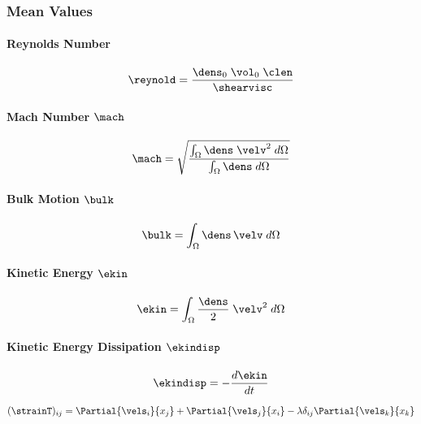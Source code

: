 \subsubsection{Mean Values}

\paragraph{Reynolds Number}

\begin{equation}
\label{eq:reynold}
    \reynold = \frac{\dens_0\;\vol_0\;\clen}{\shearvisc}
\end{equation}

\paragraph{Mach Number $\mach$}

\begin{equation}
\label{eq:mach}
    \mach = \sqrt{\frac{\int_\Omega \dens \; \velv^2 \; d\Omega}{\int_\Omega \dens \; d\Omega}}
\end{equation}

\paragraph{Bulk Motion $\bulk$}

\begin{equation}
\label{eq:bulk-motion}
    \bulk = \int_{\Omega} \dens\,\velv \; d\Omega
\end{equation}

\paragraph{Kinetic Energy $\ekin$}

\begin{equation}
\label{eq:ekin}
    \ekin = \int_\Omega \frac{\dens}{2} \; \velv^2 \; d\Omega
\end{equation}

\paragraph{Kinetic Energy Dissipation $\ekindisp$}

\begin{equation}
\label{eq:ekindisp}
    \ekindisp = -\frac{d\ekin}{dt} 
\end{equation}

\begin{equation}
\label{eq:straintensor}
    (\strainT)_{ij} = \Partial{\vels_i}{x_j} + \Partial{\vels_j}{x_i} - \lambda \delta_{ij} \Partial{\vels_k}{x_k}
\end{equation}

